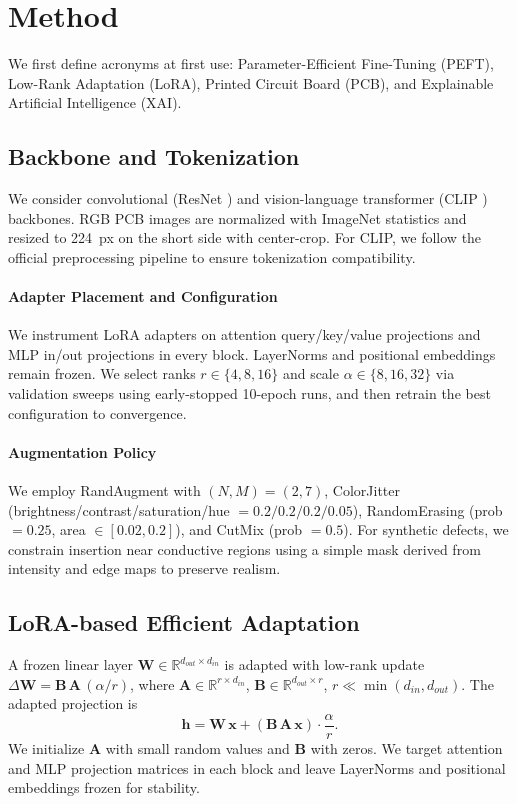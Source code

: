 \documentclass[conference]{IEEEtran}
\begin{document}
\section{Method}
We first define acronyms at first use: Parameter-Efficient Fine-Tuning (PEFT), Low-Rank Adaptation (LoRA), Printed Circuit Board (PCB), and Explainable Artificial Intelligence (XAI).

\subsection{Backbone and Tokenization}
We consider convolutional (ResNet \cite{resnet}) and vision-language transformer (CLIP \cite{clip}) backbones. RGB PCB images are normalized with ImageNet statistics and resized to \SI{224}{px} on the short side with center-crop. For CLIP, we follow the official preprocessing pipeline to ensure tokenization compatibility.

\paragraph{Adapter Placement and Configuration} We instrument LoRA adapters on attention query/key/value projections and MLP in/out projections in every block. LayerNorms and positional embeddings remain frozen. We select ranks $r\in\{4,8,16\}$ and scale $\alpha\in\{8,16,32\}$ via validation sweeps using early-stopped 10-epoch runs, and then retrain the best configuration to convergence.

\paragraph{Augmentation Policy} We employ RandAugment with $(N, M)=(2, 7)$, ColorJitter (brightness/contrast/saturation/hue $=0.2/0.2/0.2/0.05$), RandomErasing (prob $=0.25$, area $\in[0.02,0.2]$), and CutMix (prob $=0.5$). For synthetic defects, we constrain insertion near conductive regions using a simple mask derived from intensity and edge maps to preserve realism.

\subsection{LoRA-based Efficient Adaptation}
A frozen linear layer $\mathbf{W} \in \mathbb{R}^{d_{out}\times d_{in}}$ is adapted with low-rank update $\Delta\mathbf{W} = \mathbf{B}\,\mathbf{A}\,(\alpha/r)$, where $\mathbf{A} \in \mathbb{R}^{r\times d_{in}}$, $\mathbf{B} \in \mathbb{R}^{d_{out}\times r}$, $r \ll \min(d_{in}, d_{out})$. The adapted projection is
\begin{equation}
\mathbf{h} = \mathbf{W}\,\mathbf{x} + \left(\mathbf{B}\,\mathbf{A}\,\mathbf{x}\right) \cdot \frac{\alpha}{r}.
\end{equation}
We initialize $\mathbf{A}$ with small random values and $\mathbf{B}$ with zeros. We target attention and MLP projection matrices in each block and leave LayerNorms and positional embeddings frozen for stability.
\end{document}
